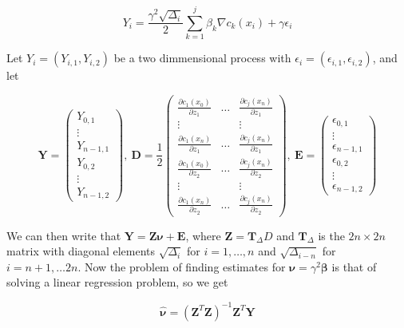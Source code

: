$$
    Y_i = \frac{\gamma^2 \sqrt{\Delta_i}}{2}\sum_{k = 1}^j \beta_k \nabla c_k(x_i) + \gamma \epsilon_i
$$

Let $Y_i = (Y_{i,1}, Y_{i,2})$ be a two dimmensional process with $\epsilon_i =(\epsilon_{i,1}, \epsilon_{i,2})$, and let

$$
    \mathbf{Y} = \begin{pmatrix}
        Y_{0,1} \\
        \vdots \\
        Y_{n-1,1}\\
        Y_{0,2}\\
        \vdots\\
        Y_{n-1,2}
    \end{pmatrix} , \    
    \mathbf{D} = \frac{1}{2} 
    \begin{pmatrix}
        \frac{\partial c_1(x_0)}{\partial z_1} & \dots & \frac{\partial c_j(x_n)}{\partial z_1} \\
        \vdots & & \vdots \\
        \frac{\partial c_1(x_n)}{\partial z_1} & \dots & \frac{\partial c_j(x_n)}{\partial z_1} \\
        \frac{\partial c_1(x_0)}{\partial z_2} & \dots & \frac{\partial c_j(x_n)}{\partial z_2} \\
        \vdots & & \vdots \\
        \frac{\partial c_1(x_n)}{\partial z_2} & \dots & \frac{\partial c_j(x_n)}{\partial z_2}
    \end{pmatrix} , \
    \mathbf{E} =\begin{pmatrix}
        \epsilon_{0,1} \\
        \vdots \\
        \epsilon_{n-1,1}\\
        \epsilon_{0,2}\\
        \vdots\\
        \epsilon_{n-1,2}
    \end{pmatrix}
$$


We can then write  that $\mathbf{Y} = \mathbf{Z} \pmb{\nu} + \mathbf{E}$, where $\mathbf{Z} = \mathbf{T}_\Delta D$ and $\mathbf{T}_\Delta$ is the $2n\times 2n$ matrix with diagonal elements $\sqrt{\Delta_i}$ for $i=1, \dots, n$ and $\sqrt{\Delta_{i-n}}$ for $i=n+1,\dots 2n$. Now the problem of finding estimates for $\pmb{\nu} = \gamma^2 \pmb{\beta}$ is that of solving a linear regression problem, so we get

$$
\pmb{\hat{\nu}} = (\mathbf{Z}^T\mathbf{Z})^{-1}\mathbf{Z}^T \mathbf{Y}
$$

